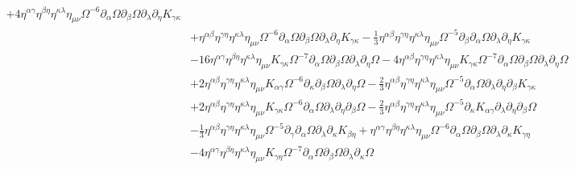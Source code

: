 \documentclass[10pt,letterpaper]{article}
\begin{document}
\begin{align}
 + 4 \eta^{\alpha \gamma} \eta^{\beta \eta} \eta^{\kappa \lambda} \eta_{\mu \nu} \Omega^{-6} \partial_{\alpha}\Omega \partial_{\beta}\Omega \partial_{\lambda}\partial_{\eta}K_{\gamma \kappa}\nonumber\\
& + \eta^{\alpha \beta} \eta^{\gamma \eta} \eta^{\kappa \lambda} \eta_{\mu \nu} \Omega^{-6} \partial_{\alpha}\Omega \partial_{\beta}\Omega \partial_{\lambda}\partial_{\eta}K_{\gamma \kappa}
 -  \tfrac{1}{3} \eta^{\alpha \beta} \eta^{\gamma \eta} \eta^{\kappa \lambda} \eta_{\mu \nu} \Omega^{-5} \partial_{\beta}\partial_{\alpha}\Omega \partial_{\lambda}\partial_{\eta}K_{\gamma \kappa}\nonumber\\
& - 16 \eta^{\alpha \gamma} \eta^{\beta \eta} \eta^{\kappa \lambda} \eta_{\mu \nu} K_{\gamma \kappa} \Omega^{-7} \partial_{\alpha}\Omega \partial_{\beta}\Omega \partial_{\lambda}\partial_{\eta}\Omega
 - 4 \eta^{\alpha \beta} \eta^{\gamma \eta} \eta^{\kappa \lambda} \eta_{\mu \nu} K_{\gamma \kappa} \Omega^{-7} \partial_{\alpha}\Omega \partial_{\beta}\Omega \partial_{\lambda}\partial_{\eta}\Omega\nonumber\\
& + 2 \eta^{\alpha \beta} \eta^{\gamma \eta} \eta^{\kappa \lambda} \eta_{\mu \nu} K_{\alpha \gamma} \Omega^{-6} \partial_{\kappa}\partial_{\beta}\Omega \partial_{\lambda}\partial_{\eta}\Omega
 -  \tfrac{2}{3} \eta^{\alpha \beta} \eta^{\gamma \eta} \eta^{\kappa \lambda} \eta_{\mu \nu} \Omega^{-5} \partial_{\alpha}\Omega \partial_{\lambda}\partial_{\eta}\partial_{\beta}K_{\gamma \kappa}\nonumber\\
& + 2 \eta^{\alpha \beta} \eta^{\gamma \eta} \eta^{\kappa \lambda} \eta_{\mu \nu} K_{\gamma \kappa} \Omega^{-6} \partial_{\alpha}\Omega \partial_{\lambda}\partial_{\eta}\partial_{\beta}\Omega
 -  \tfrac{2}{3} \eta^{\alpha \beta} \eta^{\gamma \eta} \eta^{\kappa \lambda} \eta_{\mu \nu} \Omega^{-5} \partial_{\kappa}K_{\alpha \gamma} \partial_{\lambda}\partial_{\eta}\partial_{\beta}\Omega\nonumber\\
& -  \tfrac{1}{3} \eta^{\alpha \beta} \eta^{\gamma \eta} \eta^{\kappa \lambda} \eta_{\mu \nu} \Omega^{-5} \partial_{\gamma}\partial_{\alpha}\Omega \partial_{\lambda}\partial_{\kappa}K_{\beta \eta}
 + \eta^{\alpha \gamma} \eta^{\beta \eta} \eta^{\kappa \lambda} \eta_{\mu \nu} \Omega^{-6} \partial_{\alpha}\Omega \partial_{\beta}\Omega \partial_{\lambda}\partial_{\kappa}K_{\gamma \eta}\nonumber\\
& - 4 \eta^{\alpha \gamma} \eta^{\beta \eta} \eta^{\kappa \lambda} \eta_{\mu \nu} K_{\gamma \eta} \Omega^{-7} \partial_{\alpha}\Omega \partial_{\beta}\Omega \partial_{\lambda}\partial_{\kappa}\Omega

\end{align}
\end{document}
